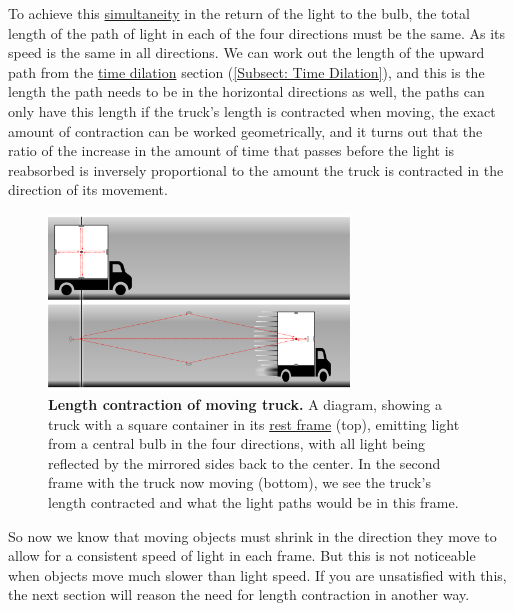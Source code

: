 To achieve this \hyperlink{def-simultaneity}{simultaneity} in the return of the light to the bulb, the total length of the path of light in each of the four directions must be the same.
As its speed is the same in all directions.
We can work out the length of the upward path from the \hyperlink{def-time-dilation}{time dilation} section (\ref{Subsect: Time Dilation}), and this is the length the path needs to be in the horizontal directions as well, the paths can only have this length if the truck's length is contracted when moving, the exact amount of contraction can be worked geometrically, and it turns out that the ratio of the increase in the amount of time that passes before the light is reabsorbed is inversely proportional to the amount the truck is contracted in the direction of its movement.

\begin{figure}[H]
	\centering
	\includegraphics[width = 8cm]{images/pdf/Full_Lorry_Transform.pdf}
	\caption{\textbf{Length contraction of moving truck.} A diagram, showing a truck with a square container in its \protect\hyperlink{def-proper-frame}{rest frame} (top), emitting light from a central bulb in the four directions, with all light being reflected by the mirrored sides back to the center. In the second frame with the truck now moving (bottom), we see the truck's length contracted and what the light paths would be in this frame.}
	\label{fig: full truck transform}
\end{figure}

So now we know that moving objects must shrink in the direction they move to allow for a consistent speed of light in each frame.
But this is not noticeable when objects move much slower than light speed.
If you are unsatisfied with this, the next section will reason the need for length contraction in another way.


